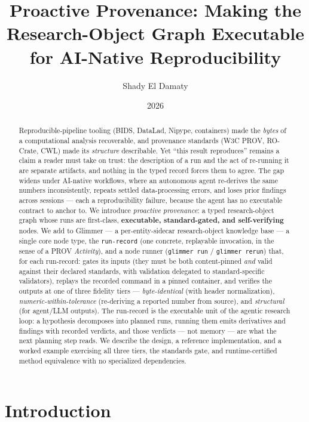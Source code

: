 \documentclass[preprint]{glimmer-paper}
\title{Proactive Provenance: Making the Research-Object Graph Executable\\ for AI-Native Reproducibility}
\author{Shady El Damaty}
\affil{Holonym / Opscientia}
\date{2026}
\newcommand{\code}[1]{\texttt{#1}}
\begin{document}
\maketitle

\begin{abstract}
Reproducible-pipeline tooling (BIDS, DataLad, Nipype, containers) made the \emph{bytes} of
a computational analysis recoverable, and provenance standards (W3C PROV, RO-Crate, CWL)
made its \emph{structure} describable. Yet ``this result reproduces'' remains a claim a
reader must take on trust: the description of a run and the act of re-running it are
separate artifacts, and nothing in the typed record forces them to agree. The gap widens
under AI-native workflows, where an autonomous agent re-derives the same numbers
inconsistently, repeats settled data-processing errors, and loses prior findings across
sessions --- each a reproducibility failure, because the agent has no executable contract
to anchor to. We introduce \emph{proactive provenance}: a typed research-object graph whose
runs are first-class, \textbf{executable, standard-gated, and self-verifying} nodes. We add
to Glimmer --- a per-entity-sidecar research-object knowledge base --- a single core node
type, the \code{run-record} (one concrete, replayable invocation, in the sense of a PROV
\emph{Activity}), and a node runner (\code{glimmer run} / \code{glimmer rerun}) that, for
each run-record: gates its inputs (they must be both content-pinned \emph{and} valid against
their declared standards, with validation delegated to standard-specific validators),
replays the recorded command in a pinned container, and verifies the outputs at one of three
fidelity tiers --- \emph{byte-identical} (with header normalization), \emph{numeric-within-tolerance}
(re-deriving a reported number from source), and \emph{structural} (for agent/LLM outputs).
The run-record is the executable unit of the agentic research loop: a hypothesis decomposes
into planned runs, running them emits derivatives and findings with recorded verdicts, and
those verdicts --- not memory --- are what the next planning step reads. We describe the
design, a reference implementation, and a worked example exercising all three tiers, the
standards gate, and runtime-certified method equivalence with no specialized dependencies.
\end{abstract}

\section{Introduction}
\end{document}
